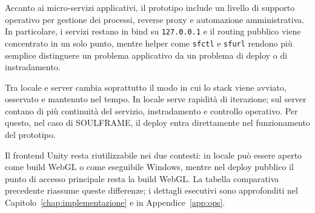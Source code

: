 Accanto ai micro-servizi applicativi, il prototipo include un livello di supporto operativo per gestione dei processi, reverse proxy e automazione amministrativa. In particolare, i servizi restano in bind su \texttt{127.0.0.1} e il routing pubblico viene concentrato in un solo punto, mentre helper come \texttt{sfctl} e \texttt{sfurl} rendono più semplice distinguere un problema applicativo da un problema di deploy o di instradamento.

Tra locale e server cambia soprattutto il modo in cui lo stack viene avviato, osservato e mantenuto nel tempo. In locale serve rapidità di iterazione; sul server contano di più continuità del servizio, instradamento e controllo operativo. Per questo, nel caso di SOULFRAME, il deploy entra direttamente nel funzionamento del prototipo.

Il frontend Unity resta riutilizzabile nei due contesti: in locale può essere aperto come build WebGL o come eseguibile Windows, mentre nel deploy pubblico il punto di accesso principale resta la build WebGL. La tabella comparativa precedente riassume queste differenze; i dettagli esecutivi sono approfonditi nel Capitolo~\ref{chap:implementazione} e in Appendice~\ref{app:ops}.
